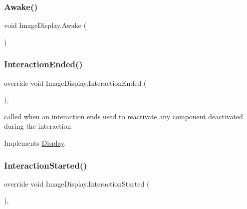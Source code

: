 \subsubsection{\texorpdfstring{Awake()}{Awake()}}
{\footnotesize\ttfamily void Image\+Display.\+Awake (\begin{DoxyParamCaption}{ }\end{DoxyParamCaption})\hspace{0.3cm}{\ttfamily [private]}}

\mbox{\label{class_image_display_a94c5928ef81449c37740d0bd0a8f4062}} 
\subsubsection{\texorpdfstring{Interaction\+Ended()}{InteractionEnded()}}
{\footnotesize\ttfamily override void Image\+Display.\+Interaction\+Ended (\begin{DoxyParamCaption}{ }\end{DoxyParamCaption})\hspace{0.3cm}{\ttfamily [protected]}, {\ttfamily [virtual]}}



called when an interaction ends used to reactivate any component deactivated during the interaction 



Implements \mbox{\hyperlink{class_display_a6fd38485267e1b78f1d1dfb589ec4ae0}{Display}}.

\mbox{\label{class_image_display_a1fdf91b09cd5329059d38033f1330ffb}} 
\subsubsection{\texorpdfstring{Interaction\+Started()}{InteractionStarted()}}
{\footnotesize\ttfamily override void Image\+Display.\+Interaction\+Started (\begin{DoxyParamCaption}{ }\end{DoxyParamCaption})\hspace{0.3cm}{\ttfamily [protected]}, {\ttfamily [virtual]}}



